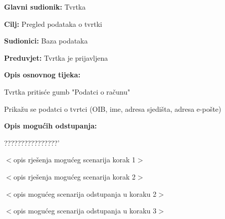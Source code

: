\noindent {}
\begin{packed_item}
	
	\item \textbf{Glavni sudionik: } Tvrtka
	\item  \textbf{Cilj:} Pregled podataka o tvrtki
	\item  \textbf{Sudionici:} Baza podataka
	\item  \textbf{Preduvjet:} Tvrtka je prijavljena
	\item  \textbf{Opis osnovnog tijeka:}
	
	\item[] \begin{packed_enum}
		
		\item Tvrtka pritisće gumb "Podatci o računu" 
		\item Prikažu se podatci o tvrtci (OIB, ime, adresa sjedišta, adresa e-pošte)
	
	\end{packed_enum}
	
	\item  \textbf{Opis mogućih odstupanja:}
	
	\item[] \begin{packed_item}
		
		\item[2.a] ????????????????'
		\item[] \begin{packed_enum}
			
			\item $<$opis rješenja mogućeg scenarija korak 1$>$
			\item $<$opis rješenja mogućeg scenarija korak 2$>$
			
		\end{packed_enum}
		\item[2.b] $<$opis mogućeg scenarija odstupanja u koraku 2$>$
		\item[3.a] $<$opis mogućeg scenarija odstupanja  u koraku 3$>$
		
	\end{packed_item}
\end{packed_item}


